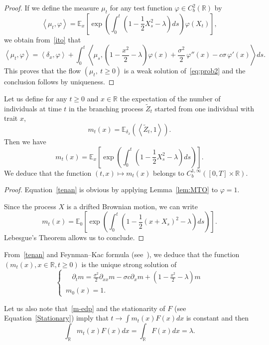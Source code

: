 \documentclass[AHL,Unicode,longabstracts,published]{cedram}
\newcommand*\R{\mathbb{R}}
\newcommand*\E{\mathbb{E}}
\begin{document}
\begin{proof}
If we define the measure $\mu_{t}$ for any test function $\varphi\in C^2_b(\R)$ by
\[
\left\langle \mu_{t}, \varphi\right\rangle = \E_{x}\left[\exp\left(\int_{0}^{t} \left(1-\frac{1}{2}X_{s}^{2}-\lambda \right)ds \right)\varphi\left(X_{t}\right) \right],
\]
we obtain from~\eqref{ito} that
\[
\left\langle \mu_{t}, \varphi\right\rangle = \left\langle \delta_{x}, \varphi\right\rangle +\int_{0}^t \left\langle \mu_{s}, \left(1-\frac{x^2}{2} -\lambda\right)\varphi(x) + \frac{\sigma^2}{2}\,\varphi''(x)- c \sigma\,\varphi'(x)\right\rangle ds.
\]
This proves that the flow $(\mu_{t},\ t\ge 0)$ is a weak solution of~\eqref{eq:prob2} and the conclusion follows by uniqueness.
\end{proof}


\begin{coro}\label{avril}
Let us define for any $t\ge 0$ and $x\in \R$ the expectation of the number of individuals at time $t$ in the branching process $\widetilde{Z}_t$ started from one individual with trait $x$,
\begin{equation}\label{m}
m_{t}(x) = \E_{\delta_{x}} \left(\left\langle \widetilde{Z}_{t}, 1\right\rangle\right).
\end{equation}
Then we have
\begin{equation}\label{tenan}
m_{t}(x) = \E_{x}\left[\exp\left(\int_{0}^{t} \left(1-\frac{1}{2}X_{s}^{2}-\lambda \right)ds \right) \right].
\end{equation}
We deduce that the function $(t,x)\mapsto m_t(x)$ belongs to $C_{b}^{1, \infty}([0,T]\times \R)$.
\end{coro}


\begin{proof}
Equation~\eqref{tenan} is obvious by applying Lemma~\ref{lem:MTO} to $\varphi=1$.

Since the process $X$ is a drifted Brownian motion, we can write
\[
m_{t}(x) = \E_{0}\left[\exp\left(\int_{0}^{t} \left(1-\frac{1}{2}\left(x+X_{s}\right)^{2}-\lambda \right)ds \right) \right].
\]
Lebesgue's Theorem allows us to conclude.
\end{proof}


\begin{rema*} 
From~\eqref{tenan} and Feynman--Kac formula (see~\cite{feynman_space-time_1948,kac_distributions_1949,kac_connections_1951}), we deduce that the function $(m_{t}(x), x\in \R, t\ge 0)$ is the unique strong solution of
\begin{equation}\label{m-edp}
\begin{cases}
\;\;\;\:\partial_{t} m=\frac{\sigma^2}{2}\partial_{xx}m-\sigma c\partial_{x}m+\left(1-\frac{x^2}{2}-\lambda\right)m\\
\,m_{0}(x)=1.
\end{cases}
\end{equation}


Let us also note that~\eqref{m-edp} and the stationarity of $F$ (see Equation~\eqref{Stationary}) imply that $t\to \int m_{t}(x) F(x) dx$ is constant and then
\begin{equation}\label{mF}
\int_{\R} m_{t}(x) F(x) dx = \int_{\R} F(x) dx = \lambda.
\end{equation}
\end{rema*}
\end{document}
